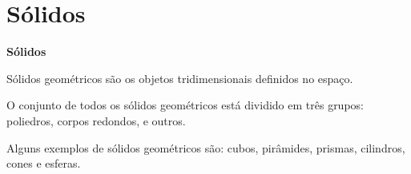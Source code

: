 \section{Sólidos}

\vskip0.3cm

\colorbox{azul}{
 \begin{minipage}{0.9\linewidth}
 \begin{center}
 \textbf{Sólidos}

  Sólidos geométricos são os objetos tridimensionais definidos no espaço.

  O conjunto de todos os sólidos geométricos está dividido em três grupos: poliedros, corpos redondos, e outros.

 \end{center}
 \end{minipage}}

 \vskip0.3cm

 Alguns exemplos de sólidos geométricos são: cubos, pirâmides, prismas, cilindros, cones e esferas.



\begin{figure}[H]
\center
{}
\qquad
{}
\end{figure}


